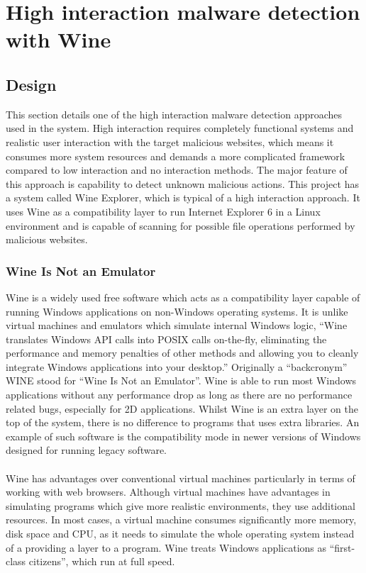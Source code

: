 \section{High interaction malware detection with Wine}
\subsection{Design}
This section details one of the high interaction malware detection 
approaches used in the system. High interaction requires completely functional systems 
and realistic user interaction with the target malicious websites, which means 
it consumes more system resources and demands a more complicated 
framework compared to low interaction and no interaction methods. The major 
feature of this approach is capability to detect unknown malicious 
actions. This project has a system called Wine Explorer, 
which is typical of a high interaction approach. It uses Wine as a compatibility layer to run 
Internet Explorer 6 in a Linux environment and is capable of scanning for 
possible file operations performed by malicious websites. 

\subsubsection{Wine Is Not an Emulator}
Wine is a widely used free software which acts as a compatibility layer 
capable of running Windows applications on non-Windows operating 
systems.\cite{wikiwine} It is unlike virtual machines and emulators which simulate 
internal Windows logic, ``Wine translates Windows API calls into POSIX calls 
on-the-fly, eliminating the performance and memory penalties of other methods 
and allowing you to cleanly integrate Windows applications into your 
desktop.''\cite{aboutwine} Originally a ``backcronym'' WINE stood for ``Wine Is Not an 
Emulator''. Wine is able to run most Windows applications 
without any performance drop as long as there are no performance related bugs, 
especially for 2D applications. Whilst Wine is an 
extra layer on the top of the system, there is no difference to programs that 
uses extra libraries. An example of such software is the compatibility 
mode in newer versions of Windows designed for running legacy 
software.\cite{wineperformance}
\paragraph{}
Wine has advantages over conventional virtual machines particularly in terms 
of working with web browsers. Although 
virtual machines have advantages in simulating programs which give more 
realistic environments, they use additional resources. In most cases, a 
virtual machine consumes significantly more memory, disk space and CPU, as it 
needs to simulate the whole operating system instead of a providing a layer 
to a program. Wine treats Windows applications as ``first-class citizens'', 
which run at full speed.\cite{wineperformance}
